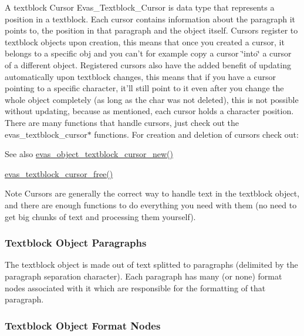 A textblock Cursor Evas\_\-Textblock\_\-Cursor is data type that represents a position in a textblock. Each cursor contains information about the paragraph it points to, the position in that paragraph and the object itself. Cursors register to textblock objects upon creation, this means that once you created a cursor, it belongs to a specific obj and you can't for example copy a cursor \char`\"{}into\char`\"{} a cursor of a different object. Registered cursors also have the added benefit of updating automatically upon textblock changes, this means that if you have a cursor pointing to a specific character, it'll still point to it even after you change the whole object completely (as long as the char was not deleted), this is not possible without updating, because as mentioned, each cursor holds a character position. There are many functions that handle cursors, just check out the evas\_\-textblock\_\-cursor$\ast$ functions. For creation and deletion of cursors check out: \begin{DoxySeeAlso}{See also}
\hyperlink{group__Evas__Object__Textblock_ga6f6242cc087a6cc65196b09e813e2c45}{evas\_\-object\_\-textblock\_\-cursor\_\-new()} 

\hyperlink{group__Evas__Object__Textblock_gaec3e250258e2f587381bcd1539469137}{evas\_\-textblock\_\-cursor\_\-free()} 
\end{DoxySeeAlso}
\begin{DoxyNote}{Note}
Cursors are generally the correct way to handle text in the textblock object, and there are enough functions to do everything you need with them (no need to get big chunks of text and processing them yourself).
\end{DoxyNote}
\hypertarget{group__Evas__Object__Textblock_textblock_paragraphs}{}\subsubsection{Textblock Object Paragraphs}\label{group__Evas__Object__Textblock_textblock_paragraphs}
The textblock object is made out of text splitted to paragraphs (delimited by the paragraph separation character). Each paragraph has many (or none) format nodes associated with it which are responsible for the formatting of that paragraph.\hypertarget{group__Evas__Object__Textblock_textblock_format_nodes}{}\subsubsection{Textblock Object Format Nodes}\label{group__Evas__Object__Textblock_textblock_format_nodes}
